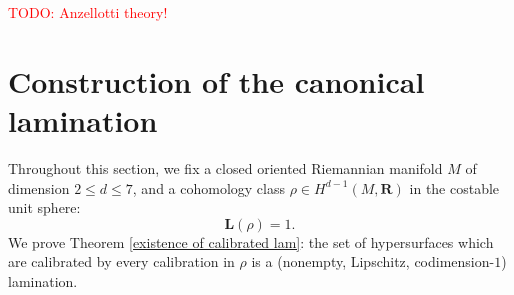 \documentclass[reqno,11pt]{amsart}
\newcommand{\RR}{\mathbf{R}}
\DeclareMathOperator{\supp}{supp}
\newcommand{\MCL}{\mathrm{MCL}}
\newcommand{\Mass}{\mathbf M}
\newcommand{\Comass}{\mathbf L}
\newcommand{\dfn}[1]{\emph{#1}\index{#1}}
\newtheorem{proposition}[theorem]{Proposition}
\newtheorem{corollary}[theorem]{Corollary}
\theoremstyle{definition}
\newtheorem{definition}[theorem]{Definition}
\numberwithin{equation}{section}
\newcommand\todo[1]{\textcolor{red}{TODO: #1}}
\begin{document}



\todo{Anzellotti theory!}

\section{Construction of the canonical lamination}
\label{canonical sec}
Throughout this section, we fix a closed oriented Riemannian manifold $M$ of dimension $2 \leq d \leq 7$, and a cohomology class $\rho \in H^{d - 1}(M, \RR)$ in the costable unit sphere:
$$\Comass(\rho) = 1.$$
We prove Theorem \ref{existence of calibrated lam}: the set of hypersurfaces which are calibrated by every calibration in $\rho$ is a (nonempty, Lipschitz, codimension-$1$) lamination.
\end{document}
